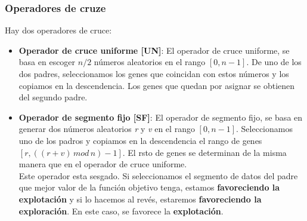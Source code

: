 \subsubsection{Operadores de cruze}
Hay dos operadores de cruce:
\begin{itemize}
   \item \textbf{Operador de cruce uniforme [UN]}: El operador de cruce uniforme, se basa en escoger $ n/2 $ números aleatorios en el rango $[0,n-1]$. De uno de los dos padres, seleccionamos los genes que coincidan con estos números y los copiamos en la descendencia. Los genes que quedan por asignar se obtienen del segundo padre.
   \item \textbf{Operador de segmento fijo [SF]}: El operador de segmento fijo, se basa en generar dos números aleatorios \emph{r} y \emph{v} en el rango $[0,n-1]$. Seleccionamos uno de los padros y copiamos en la descendencia el rango de genes $ [r,((r+v)\,mod\,n) - 1] $. El rsto de genes se determinan de la misma manera que en el operador de cruce uniforme.\\
   Este operador esta sesgado. Si seleccionamos el segmento de datos del padre que mejor valor de la función objetivo tenga, estamos \textbf{favoreciendo la explotación} y si lo hacemos al revés, estaremos \textbf{favoreciendo la exploración}. En este caso, se favorece la \textbf{explotación}.
\end{itemize}
